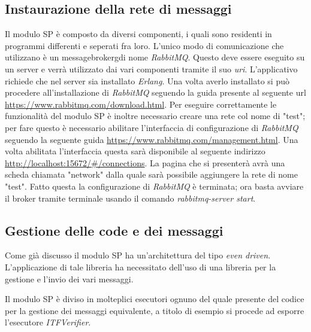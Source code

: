 \subsection{Instaurazione della rete di messaggi}
Il modulo SP è composto da diversi componenti, i quali sono residenti in programmi differenti e seperati fra loro. L'unico modo di comunicazione che utilizzano è un \gls{messagebrokerg}\glsfirstoccur di nome \emph{RabbitMQ}. Questo deve essere eseguito su un server e verrà utilizzato dai vari componenti tramite il suo \emph{uri}.
L'applicativo richiede che nel server sia installato \emph{Erlang}. Una volta averlo installato si può procedere all'installazione di \emph{RabbitMQ} seguendo la guida presente al seguente url \url{https://www.rabbitmq.com/download.html}. Per eseguire correttamente le funzionalità del modulo SP è inoltre necessario creare una rete col nome di "test"; per fare questo è necessario abilitare l'interfaccia di configurazione di \emph{RabbitMQ} seguendo la seguente guida \url{https://www.rabbitmq.com/management.html}.
Una volta abilitata l'interfaccia questa sarà disponibile al seguente indirizzo \url{http://localhost:15672/#/connections}. La pagina che si presenterà avrà una scheda chiamata "network" dalla quale sarà possibile aggiungere la rete di nome "test".
Fatto questa la configurazione di \emph{RabbitMQ} è terminata; ora basta avviare il broker tramite terminale usando il comando \emph{rabbitmq-server start}.


\subsection{Gestione delle code e dei messaggi}
Come già discusso il modulo SP ha un'architettura del tipo \emph{even driven}. L'applicazione di tale libreria ha necessitato dell'uso di una libreria per la gestione e l'invio dei vari messaggi.

Il modulo SP è diviso in molteplici esecutori ognuno del quale presente del codice per la gestione dei messaggi equivalente, a titolo di esempio si procede ad esporre l'esecutore \emph{ITFVerifier}.

